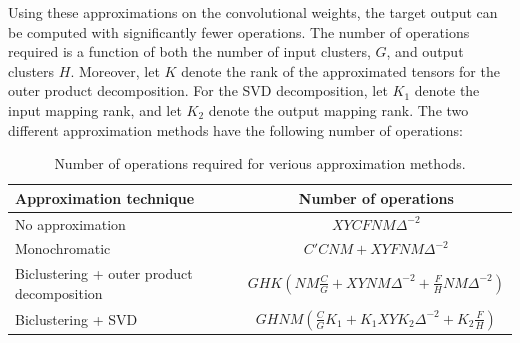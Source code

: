 Using these approximations on the convolutional weights, the target
output can be computed with significantly fewer operations. The number
of operations required is a function of both the number
of input clusters, $G$, and output clusters $H$.  Moreover, let $K$ denote the
rank of the approximated tensors for the outer product decomposition.
For the SVD decomposition, let $K_1$ denote the input mapping rank, and let $K_2$ denote the output mapping rank. The two different approximation methods have the following number of
operations:

\begin{table}[t]
\tiny
\centering
\begin{tabular}{lc}
\hline
Approximation technique & Number of operations \\
\hline
No approximation & $X Y C F N M \Delta^{-2}$\\
Monochromatic & $C' C N M + X Y F N M \Delta^{-2}$\\
Biclustering + outer product decomposition & $G H K (N M \frac{C}{G} + X Y N M \Delta^{-2} + \frac{F}{H} N M \Delta^{-2})$ \\  
Biclustering + SVD & $G H N M (\frac{C}{G}K_1 + K_1 X Y K_2 \Delta^{-2} + K_2\frac{F}{H})$\\
\end{tabular}
\caption{Number of operations required for verious approximation methods.} 
\label{table:ops}
\end{table}

%
%
%






